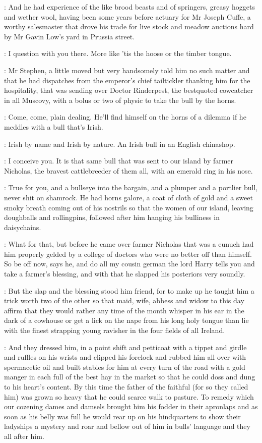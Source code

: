 :
And he had experience of the like brood beasts and of springers,
greasy hoggets and wether wool,
having been some years before actuary for Mr Joseph Cuffe,
a worthy salesmaster that drove his trade for live stock
and meadow auctions hard by Mr Gavin Low's yard in Prussia street.

\Bloom:
I question with you there.
More like 'tis the hoose or the timber tongue.

:
Mr Stephen,
a little moved but very handsomely told him no such
matter and that he had dispatches from the emperor's chief tailtickler
thanking him for the hospitality,
that was sending over Doctor
Rinderpest,
the bestquoted cowcatcher in all Muscovy,
with a bolus or two
of physic to take the bull by the horns.

\lynch:
Come,
come,
plain dealing.
He'll find himself on the horns of a dilemma if he meddles
with a bull that's Irish.

\stephen:
Irish by name and Irish by nature.
An Irish bull in an English chinashop.

\dixon:
I conceive you.
It is that same bull that was sent to our island by
farmer Nicholas,
the bravest cattlebreeder of them all,
with an emerald
ring in his nose.

\lynch:
True for you,
and a bullseye into the bargain,
and a
plumper and a portlier bull,
never shit on shamrock.
He had
horns galore,
a coat of cloth of gold and a sweet smoky breath coming out
of his nostrils so that the women of our island,
leaving doughballs and
rollingpins,
followed after him hanging his bulliness in daisychains.

\dixon:
What for that,
but before he came over farmer Nicholas
that was a eunuch had him properly gelded
by a college of doctors who were no better off than himself.
So be off now,
says he,
and do all my
cousin german the lord Harry tells you and take a farmer's blessing,
and
with that he slapped his posteriors very soundly.

\lynch:
But the slap and the blessing stood him friend,
for to make up he
taught him a trick worth two of the other so that maid,
wife,
abbess and widow to this day affirm that they would rather any time of the month
whisper in his ear in the dark of a cowhouse or get a lick on the nape
from his long holy tongue than lie with the finest strapping young
ravisher in the four fields of all Ireland.

\madden:
And they dressed him,
in a point shift and petticoat with a tippet and girdle
and ruffles on his wrists and clipped his forelock and rubbed
him all over with spermacetic oil and built stables for him at every turn
of the road with a gold manger in each full of the best hay in the market
so that he could doss and dung to his heart's content.
By this time the
father of the faithful
(for so they called him)
was grown so heavy that he
could scarce walk to pasture.
To remedy which our cozening dames and
damsels brought him his fodder in their apronlaps and as soon as his belly
was full he would rear up on his hindquarters to show their ladyships a
mystery and roar and bellow out of him in bulls' language and they all
after him.

